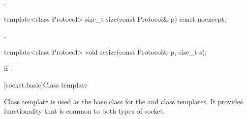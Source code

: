 \begin{itemdescr}
\pnum
\returns {}.
\end{itemdescr}

\begin{itemdecl}
template<class Protocol> size_t size(const Protocol& p) const noexcept;
\end{itemdecl}

\begin{itemdescr}
\pnum
\returns {}.
\end{itemdescr}

\begin{itemdecl}
template<class Protocol> void resize(const Protocol& p, size_t s);
\end{itemdecl}

\begin{itemdescr}
\pnum
\remarks {} if .
\end{itemdescr}




%
[socket.basic]{Class template }

\pnum
Class template  is used as the base class for the  and  class templates. It provides functionality that is common to both types of socket.

